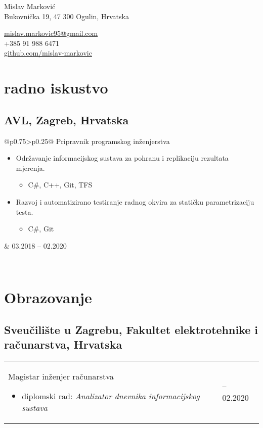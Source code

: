 \documentclass[a4paper]{article}
\makeatletter
\newlength{\tablewidth}
\newenvironment{period}[2]{%
\newcommand{\sarma}{#2}%
\setlength{\tablewidth}{\linewidth}
\addtolength{\tablewidth}{-2\tabcolsep}
\begin{tabular}{@{}p{0.75\tablewidth}>{\raggedleft\arraybackslash}p{0.25\tablewidth}@{}}%
#1 \newline
\begin{itemize}
}{%
\end{itemize} & \sarma \\%
\end{tabular}\\
}
\makeatother
\begin{document}
\fontfamily{\sfdefault}
\selectfont

\begin{minipage}{.5\textwidth}
\LARGE{Mislav Marković}\\
\normalsize{Bukovnička 19, 47 300 Ogulin, Hrvatska}
\end{minipage}%
\begin{minipage}{.5\textwidth}
\raggedleft
\href{mailto:mislav.markovic95@gmail.com}{mislav.markovic95@gmail.com} \\
+385 91 988 6471 \\
\href{https://github.com/mislav-markovic}{github.com/mislav-markovic}
\end{minipage}

\vspace{1em}

\section{radno iskustvo}
\subsection{AVL, Zagreb, Hrvatska}
\begin{period}{Pripravnik programskog in\v{z}enjerstva}{03.2018 -- 02.2020}
    \item 
        Odr\v{z}avanje informacijskog sustava za pohranu i replikaciju rezultata mjerenja.
        \begin{itemize}
            \item C\#, C++, Git, TFS
        \end{itemize}
        \item 
        Razvoj i automatizirano testiranje radnog okvira za stati\v{c}ku parametrizaciju testa.
        \begin{itemize}
            \item C\#, Git
        \end{itemize}
\end{period}


\section{Obrazovanje}
\subsection{Sveu\v{c}ili\v{s}te u Zagrebu, Fakultet elektrotehnike i ra\v{c}unarstva, Hrvatska}
\begin{period}{Magistar in\v{z}enjer ra\v{c}unarstva}{2017 -- 2020}
    \item diplomski rad:
        \textit{Analizator dnevnika informacijskog sustava}
\end{period}
\end{document}
